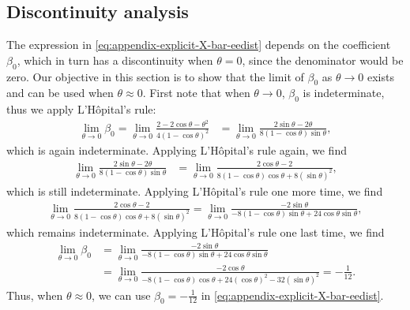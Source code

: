 \subsection{Discontinuity analysis}\label{app:discontinuity-beta-EEdist}
The expression in \eqref{eq:appendix-explicit-X-bar-eedist} depends on the coefficient $\beta_0$, which in turn has a discontinuity when $\theta=0$, since the denominator would be zero. Our objective in this section is to show that the limit of $\beta_0$ as $\theta\to 0$ exists and can be used when $\theta\approx0$. First note that when $\theta\to 0$, $\beta_0$ is indeterminate, thus we apply L'Hôpital's rule:
\begin{align}
    \lim_{\theta\to0}\beta_0=\lim_{\theta\to0} \frac{2-2\cos\theta-\theta^2}{4(1 - \cos\theta)^2}
    &= \lim_{\theta\to0} \frac{2\sin\theta-2\theta}{8(1 - \cos\theta)\sin\theta},
\end{align}
which is again indeterminate. Applying L'Hôpital's rule again, we find
\begin{align}
    \lim_{\theta\to0} \frac{2\sin\theta-2\theta}{8(1 - \cos\theta)\sin\theta}
    &= \lim_{\theta\to0} \frac{2\cos\theta-2}{8(1 - \cos\theta)\cos\theta +8(\sin\theta)^2},
\end{align}
which is still indeterminate. Applying L'Hôpital's rule one more time, we find
\begin{align}
    \lim_{\theta\to0} \frac{2\cos\theta-2}{8(1 - \cos\theta)\cos\theta +8(\sin\theta)^2} =
    \lim_{\theta\to0}\frac{-2\sin\theta}{-8(1 - \cos\theta)\sin\theta +24\cos\theta\sin\theta},
\end{align}
which remains indeterminate. Applying L'Hôpital's rule one last time, we find
\begin{align}
    \lim_{\theta\to0}\beta_0&=\lim_{\theta\to0}\frac{-2\sin\theta}{-8(1 - \cos\theta)\sin\theta +24\cos\theta\sin\theta} \\
    &=
    \lim_{\theta\to0}\frac{-2\cos\theta}{-8(1 - \cos\theta)\cos\theta +24(\cos\theta)^2-32(\sin\theta)^2} = -\frac{1}{12}.
\end{align}
Thus, when $\theta\approx0$, we can use $\beta_0=-\frac{1}{12}$ in \eqref{eq:appendix-explicit-X-bar-eedist}.

